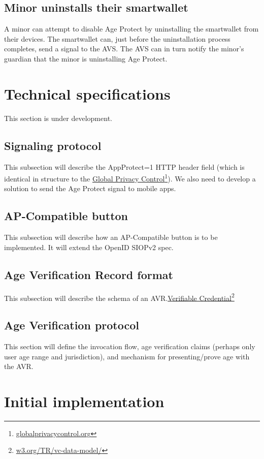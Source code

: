 \documentclass[11pt, oneside]{article}   	%
\newcommand{\hyperfootnote}[1][]{\def\ArgI{{#1}}\hyperfootnoteRelay}
\newcommand\hyperfootnoteRelay[2][]{\href{#1#2}{\ArgI}\footnote{\href{#1#2}{#2}}}
\begin{document}
\subsection{Minor uninstalls their smartwallet}

A minor can attempt to disable Age Protect by uninstalling the smartwallet from their devices. The smartwallet can, just before the uninstallation process completes, send a signal to the AVS. The AVS can in turn notify the minor's guardian that the minor is uninstalling Age Protect.


\section{Technical specifications}

This section is under development.

\subsection{Signaling protocol}
This subsection will describe the AppProtect=1 HTTP header field (which is identical in structure to the \hyperfootnote[Global Privacy Control][https://]{globalprivacycontrol.org}). We also need to develop a solution to send the Age Protect signal to mobile apps.

\subsection{AP-Compatible button}
This subsection will describe how an AP-Compatible button is to be implemented. It will extend the OpenID SIOPv2 spec. 

\subsection{Age Verification Record format}
This subsection will describe the schema of an AVR.\hyperfootnote[Verifiable Credential][https://]{w3.org/TR/vc-data-model/}

\subsection{Age Verification protocol}
This section will define the invocation flow, age verification claims (perhaps only user age range and jurisdiction), and mechanism for presenting/prove age with the AVR. 

\section{Initial implementation}
\end{document}
